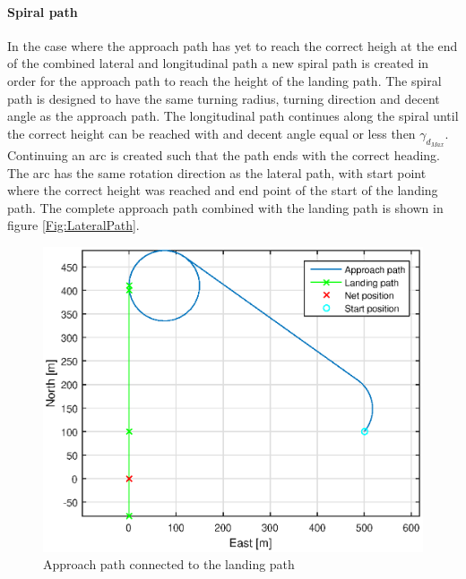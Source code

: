\paragraph{Spiral path}\label{pp:SpiralPath}
In the case where the approach path has yet to reach the correct heigh at the end of the combined lateral and longitudinal path a new spiral path is created in order for the approach path to reach the height of the landing path. The spiral path is designed to have the same turning radius, turning direction and decent angle as the approach path. The longitudinal path continues along the spiral until the correct height can be reached with and decent angle equal or less then $\gamma_{d_{Max}}$. Continuing an arc is created such that the path ends with the correct heading. The arc has the same rotation direction as the lateral path, with start point where the correct height was reached and end point of the start of the landing path. The complete approach path combined with the landing path is shown in figure \ref{Fig:LateralPath}.
\begin{figure}[H]
	\centering
		\includegraphics[scale=0.7]{figs/SysPlot/LandingPath.eps}
		\caption{Approach path connected to the landing path}
		\label{Fig:LandingPath}
\end{figure}
